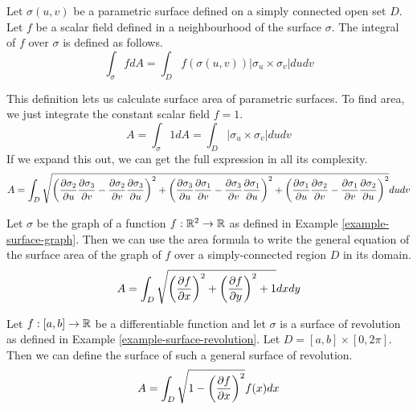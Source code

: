 \documentclass[fleqn,letterpaper]{report}
\begin{document}
\begin{defn}
Let $\sigma(u,v)$ be a parametric surface defined on a simply
connected open set $D$. Let $f$ be a scalar field defined in a
neighbourhood of the surface $\sigma$. The integral of $f$
over $\sigma$ is defined as follows.
\begin{equation*}
\int_\sigma f dA = \int_D f(\sigma(u,v)) |\sigma_u \times
\sigma_v | du dv
\end{equation*}
\end{defn}

This definition lets us calculate surface area of
parametric surfaces. To find area, we just integrate the
constant scalar field $f = 1$. 
\begin{equation*}
A = \int_\sigma 1 dA = \int_D |\sigma_u \times \sigma_v| du dv 
\end{equation*}
If we expand this out, we can get the full expression in all
its complexity.
\begin{equation*}
A = \int_D \sqrt{
\left( \frac{\partial \sigma_2}{\partial u} \frac{\partial \sigma_3}{\partial v}
- \frac{\partial \sigma_2}{\partial v} \frac{\partial \sigma_3}{\partial u}
 \right)^2 + 
\left( \frac{\partial \sigma_3}{\partial u} \frac{\partial \sigma_1}{\partial v}
- \frac{\partial \sigma_3}{\partial v} \frac{\partial \sigma_1}{\partial u}
 \right)^2 + 
\left( \frac{\partial \sigma_1}{\partial u} \frac{\partial \sigma_2}{\partial v}
- \frac{\partial \sigma_1}{\partial v} \frac{\partial \sigma_2}{\partial u} \right)^2 }
du dv
\end{equation*}

\begin{example}
Let $\sigma$ be the graph of a
function $f: \mathbb{R}^2 \rightarrow \mathbb{R}$ as defined in Example
\ref{example-surface-graph}. Then we can use the area formula
to write the general equation of the surface area of the graph
of $f$ over a simply-connected region $D$ in its domain.
\begin{equation*}
A = \int_D \sqrt{ \left( \frac{\partial f}{\partial x} \right)^2 +
\left( \frac{\partial f}{\partial y} \right)^2 + 1} dx dy 
\end{equation*}
\end{example}

\begin{example}
Let $f: [a,b] \rightarrow \mathbb{R}$ be a differentiable function
and let $\sigma$ is a surface of
revolution as defined in Example \ref{example-surface-revolution}. Let
$D = [a,b] \times [0,2\pi]$. Then we can define the surface of such a
general surface of revolution.
\begin{equation*}
A = \int_D \sqrt{ 1 - \left( \frac{\partial f}{\partial x} \right)^2}
f(x) dx 
\end{equation*}
\end{example}
\end{document}
